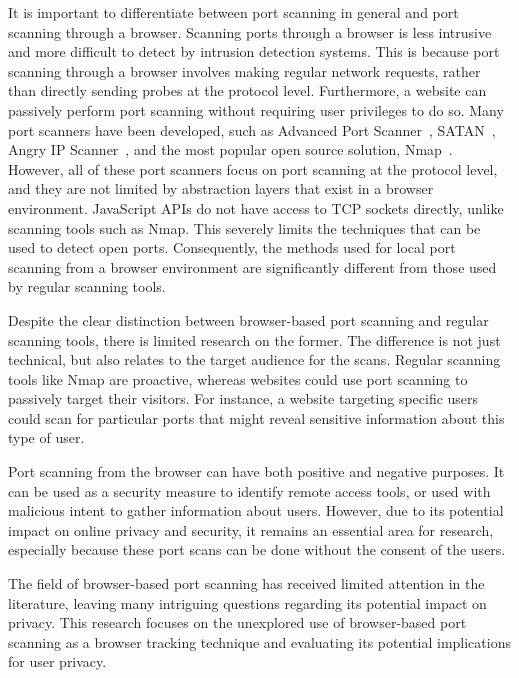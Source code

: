 
It is important to differentiate between port scanning in general and port scanning through a browser. 
Scanning ports through a browser is less intrusive and more difficult to detect by intrusion detection systems. This is because port scanning through a browser involves making regular network requests, rather than directly sending probes at the protocol level. Furthermore, a website can passively perform port scanning without requiring user privileges to do so.
Many port scanners have been developed, such as Advanced Port Scanner~, SATAN~, Angry IP Scanner~, and the most popular open source solution, Nmap~. However, all of these port scanners focus on port scanning at the protocol level, and they are not limited by abstraction layers that exist in a browser environment. JavaScript APIs do not have access to TCP sockets directly, unlike scanning tools such as Nmap. This severely limits the techniques that can be used to detect open ports. Consequently, the methods used for local port scanning from a browser environment are significantly different from those used by regular scanning tools.

Despite the clear distinction between browser-based port scanning and regular scanning tools, there is limited research on the former. The difference is not just technical, but also relates to the target audience for the scans. Regular scanning tools like Nmap are proactive, whereas websites could use port scanning to passively target their visitors. For instance, a website targeting specific users could scan for particular ports that might reveal sensitive information about this type of user.

Port scanning from the browser can have both positive and negative purposes. It can be used as a security measure to identify remote access tools, or used with malicious intent to gather information about users. However, due to its potential impact on online privacy and security, it remains an essential area for research, especially because these port scans can be done without the consent of the users.

The field of browser-based port scanning has received limited attention in the literature, leaving many intriguing questions regarding its potential impact on privacy. This research focuses on the unexplored use of browser-based port scanning as a browser tracking technique and evaluating its potential implications for user privacy. 

